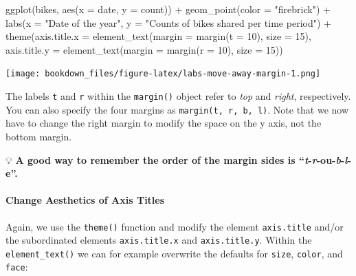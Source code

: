 \documentclass[
]{krantz}
\makeatletter
\newenvironment{Shaded}{\begin{snugshade}}{\end{snugshade}}
\newcommand{\AttributeTok}[1]{\textcolor[rgb]{0.61,0.61,0.61}{#1}}
\newcommand{\DecValTok}[1]{\textcolor[rgb]{0.06,0.06,0.06}{#1}}
\newcommand{\FunctionTok}[1]{\textcolor[rgb]{0,0,0}{#1}}
\newcommand{\NormalTok}[1]{#1}
\newcommand{\SpecialCharTok}[1]{\textcolor[rgb]{0,0,0}{#1}}
\newcommand{\StringTok}[1]{\textcolor[rgb]{0.5,0.5,0.5}{#1}}
\newenvironment{kframe}{%
\medskip{}
\setlength{\fboxsep}{.8em}
 \def\at@end@of@kframe{}%
 \ifinner\ifhmode%
  \def\at@end@of@kframe{\end{minipage}}%
  \begin{minipage}{\columnwidth}%
 \fi\fi%
 \def\FrameCommand##1{\hskip\@totalleftmargin \hskip-\fboxsep
 \colorbox{shadecolor}{##1}\hskip-\fboxsep
     \hskip-\linewidth \hskip-\@totalleftmargin \hskip\columnwidth}%
 \MakeFramed {\advance\hsize-\width
   \@totalleftmargin\z@ \linewidth\hsize
   \@setminipage}}%
 {\par\unskip\endMakeFramed%
 \at@end@of@kframe}
\renewenvironment{Shaded}{\begin{kframe}}{\end{kframe}}
\makeatother
\begin{document}
\begin{Shaded}
\begin{Highlighting}[]
\FunctionTok{ggplot}\NormalTok{(bikes, }\FunctionTok{aes}\NormalTok{(}\AttributeTok{x =}\NormalTok{ date, }\AttributeTok{y =}\NormalTok{ count)) }\SpecialCharTok{+}
  \FunctionTok{geom\_point}\NormalTok{(}\AttributeTok{color =} \StringTok{"firebrick"}\NormalTok{) }\SpecialCharTok{+}
  \FunctionTok{labs}\NormalTok{(}\AttributeTok{x =} \StringTok{"Date of the year"}\NormalTok{, }
       \AttributeTok{y =} \StringTok{"Counts of bikes shared per time period"}\NormalTok{) }\SpecialCharTok{+}
  \FunctionTok{theme}\NormalTok{(}\AttributeTok{axis.title.x =} \FunctionTok{element\_text}\NormalTok{(}\AttributeTok{margin =} \FunctionTok{margin}\NormalTok{(}\AttributeTok{t =} \DecValTok{10}\NormalTok{), }\AttributeTok{size =} \DecValTok{15}\NormalTok{),}
        \AttributeTok{axis.title.y =} \FunctionTok{element\_text}\NormalTok{(}\AttributeTok{margin =} \FunctionTok{margin}\NormalTok{(}\AttributeTok{r =} \DecValTok{10}\NormalTok{), }\AttributeTok{size =} \DecValTok{15}\NormalTok{))}
\end{Highlighting}
\end{Shaded}

\texttt{[image: bookdown\_files/figure-latex/labs-move-away-margin-1.png]}

The labels \texttt{t} and \texttt{r} within the \texttt{margin()} object refer to \emph{top} and \emph{right}, respectively. You can also specify the four margins as \texttt{margin(t,\ r,\ b,\ l)}. Note that we now have to change the right margin to modify the space on the y axis, not the bottom margin.

💡 \textbf{A good way to remember the order of the margin sides is ``\emph{t}-\emph{r}-ou-\emph{b}-\emph{l}-e''.}

\hypertarget{change-aesthetics-of-axis-titles}{%
\paragraph{Change Aesthetics of Axis Titles}\label{change-aesthetics-of-axis-titles}}

Again, we use the \texttt{theme()} function and modify the element \texttt{axis.title} and/or the subordinated elements \texttt{axis.title.x} and \texttt{axis.title.y}. Within the \texttt{element\_text()} we can for example overwrite the defaults for \texttt{size}, \texttt{color}, and \texttt{face}:
\end{document}
